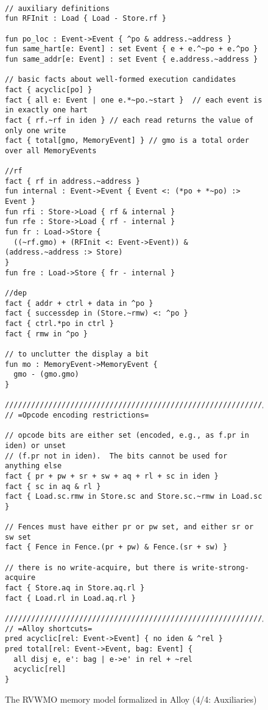 \begin{figure}[h!]
  {
  \tt\bfseries\centering\footnotesize
  \begin{lstlisting}
// auxiliary definitions
fun RFInit : Load { Load - Store.rf }

fun po_loc : Event->Event { ^po & address.~address }
fun same_hart[e: Event] : set Event { e + e.^~po + e.^po }
fun same_addr[e: Event] : set Event { e.address.~address }

// basic facts about well-formed execution candidates
fact { acyclic[po] }
fact { all e: Event | one e.*~po.~start }  // each event is in exactly one hart
fact { rf.~rf in iden } // each read returns the value of only one write
fact { total[gmo, MemoryEvent] } // gmo is a total order over all MemoryEvents

//rf
fact { rf in address.~address }
fun internal : Event->Event { Event <: (*po + *~po) :> Event }
fun rfi : Store->Load { rf & internal }
fun rfe : Store->Load { rf - internal }
fun fr : Load->Store {
  ((~rf.gmo) + (RFInit <: Event->Event)) & (address.~address :> Store)
}
fun fre : Load->Store { fr - internal }

//dep
fact { addr + ctrl + data in ^po }
fact { successdep in (Store.~rmw) <: ^po }
fact { ctrl.*po in ctrl }
fact { rmw in ^po }

// to unclutter the display a bit
fun mo : MemoryEvent->MemoryEvent {
  gmo - (gmo.gmo)
}

////////////////////////////////////////////////////////////////////////////////
// =Opcode encoding restrictions=

// opcode bits are either set (encoded, e.g., as f.pr in iden) or unset
// (f.pr not in iden).  The bits cannot be used for anything else
fact { pr + pw + sr + sw + aq + rl + sc in iden }
fact { sc in aq & rl }
fact { Load.sc.rmw in Store.sc and Store.sc.~rmw in Load.sc }

// Fences must have either pr or pw set, and either sr or sw set
fact { Fence in Fence.(pr + pw) & Fence.(sr + sw) }

// there is no write-acquire, but there is write-strong-acquire
fact { Store.aq in Store.aq.rl }
fact { Load.rl in Load.aq.rl }

////////////////////////////////////////////////////////////////////////////////
// =Alloy shortcuts=
pred acyclic[rel: Event->Event] { no iden & ^rel }
pred total[rel: Event->Event, bag: Event] {
  all disj e, e': bag | e->e' in rel + ~rel
  acyclic[rel]
}
\end{lstlisting}}
  \caption{The RVWMO memory model formalized in Alloy (4/4: Auxiliaries)}
  \label{fig:alloy4}
\end{figure}


